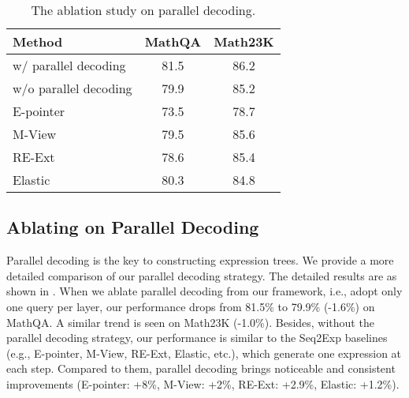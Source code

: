 \documentclass[11pt]{article}
\begin{document}
\begin{table}[t]\small
\centering
\begin{tabular}{lcc}
\toprule
\textbf{Method} & \textbf{MathQA} & \textbf{Math23K} \\
\midrule
w/ parallel decoding & 81.5 & 86.2 \\
w/o parallel decoding & 79.9 & 85.2 \\
E-pointer & 73.5 & 78.7 \\
M-View & 79.5 & 85.6 \\
RE-Ext & 78.6 & 85.4 \\
Elastic & 80.3 & 84.8 \\
\bottomrule
\end{tabular}
\caption{The ablation study on parallel decoding.}
\label{table: further ablation}
\end{table}




 
\subsection{Ablating on Parallel Decoding} \label{Ablating on Parallel Decoding}
Parallel decoding is the key to constructing expression trees. We provide a more detailed comparison of our parallel decoding strategy. The detailed results are as shown in . When we ablate parallel decoding from our framework, i.e., adopt only one query per layer, our performance drops from 81.5\% to 79.9\% (-1.6\%) on MathQA. A similar trend is seen on Math23K (-1.0\%). Besides, without the parallel decoding strategy, our performance is similar to the Seq2Exp baselines (e.g., E-pointer, M-View, RE-Ext, Elastic, etc.), which generate one expression at each step. Compared to them, parallel decoding brings noticeable and consistent improvements (E-pointer: +8\%, M-View: +2\%, RE-Ext: +2.9\%, Elastic: +1.2\%).
\end{document}
